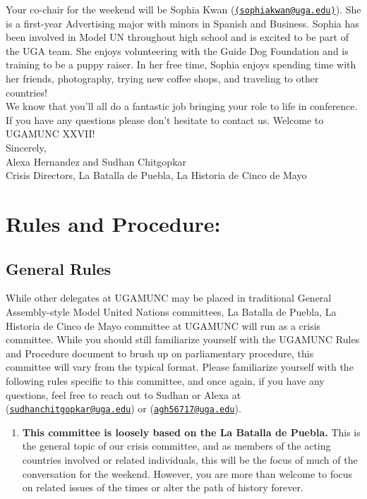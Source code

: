 \documentclass[10pt, letterpaper]{article}
\begin{document}
Your co-chair for the weekend will be Sophia Kwan (\texttt{\href{mailto:sophiakwan@uga.edu}{(sophiakwan@uga.edu)}}).
She is a first-year Advertising major with minors in Spanish and Business. Sophia has been involved in Model UN throughout high school and is excited to be part of the UGA team. She enjoys volunteering with the Guide Dog Foundation and is training to be a puppy raiser. In her free time, Sophia enjoys spending time with her friends, photography, trying new coffee shops, and traveling to other countries! \\

We know that you'll all do a fantastic job bringing your role to life in
conference. If you have any questions please don't hesitate to contact
us. Welcome to UGAMUNC XXVII! \\

Sincerely,\\
Alexa Hernandez and Sudhan Chitgopkar \\
Crisis Directors, La Batalla de Puebla, La Historia de Cinco de Mayo

\newpage
\tableofcontents
\newpage

\section{{Rules and Procedure:}}
\subsection{General Rules}
While other delegates at UGAMUNC may be placed in traditional General
Assembly-style Model United Nations committees, La Batalla de Puebla, La
Historia de Cinco de Mayo committee at UGAMUNC will run as a crisis
committee. While you should still familiarize yourself with the UGAMUNC
Rules and Procedure document to brush up on parliamentary procedure,
this committee will vary from the typical format. Please familiarize
yourself with the following rules specific to this committee, and once
again, if you have any questions, feel free to reach out to Sudhan or Alexa
at
(\texttt{\href{mailto:sudhanchitgopcar@uga.edu}{{sudhanchitgopkar@uga.edu}}})
or (\texttt{\href{mailto:agh56717@uga.edu}{{agh56717@uga.edu}}}).

\begin{enumerate}
\def\labelenumi{\arabic{enumi}.}
\item
  
  \textbf{This committee is loosely based on the La Batalla de Puebla.}
  This is the general topic of our crisis committee, and as members of
  the acting countries involved or related individuals, this will be the
  focus of much of the conversation for the weekend. However, you are
  more than welcome to focus on related issues of the times or alter the
  path of history forever.
  
\end{enumerate}
\end{document}
